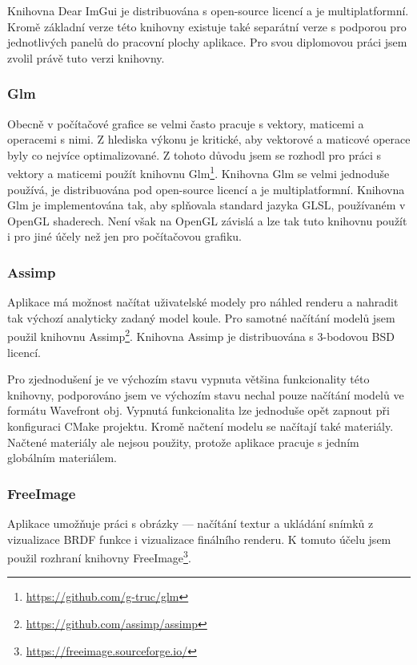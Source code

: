 \documentclass[czech,master]{diploma}
\begin{document}
Knihovna Dear ImGui je distribuována s open-source licencí a je multiplatformní. Kromě základní verze této knihovny existuje také separátní verze s podporou pro  jednotlivých panelů do pracovní plochy aplikace. Pro svou diplomovou práci jsem zvolil právě tuto verzi knihovny.

\subsubsection{Glm}
Obecně v počítačové grafice se velmi často pracuje s vektory, maticemi a operacemi s nimi. Z hlediska výkonu je kritické, aby vektorové a maticové operace byly co nejvíce optimalizované. Z tohoto důvodu jsem se rozhodl pro práci s vektory a maticemi použít knihovnu Glm\footnote{\url{https://github.com/g-truc/glm}}. Knihovna Glm se velmi jednoduše používá, je distribuována pod open-source licencí a je multiplatformní. Knihovna Glm je implementována tak, aby splňovala standard jazyka GLSL, používaném v OpenGL shaderech. Není však na OpenGL závislá a lze tak tuto knihovnu použít i pro jiné účely než jen pro počítačovou grafiku.

\subsubsection{Assimp}
Aplikace má možnost načítat uživatelské modely pro náhled renderu a nahradit tak výchozí analyticky zadaný model koule. Pro samotné načítání modelů jsem použil knihovnu Assimp\footnote{\url{https://github.com/assimp/assimp}}. Knihovna Assimp je distribuována s 3-bodovou BSD licencí. \par
Pro zjednodušení je ve výchozím stavu vypnuta většina funkcionality této knihovny, podporováno jsem ve výchozím stavu nechal pouze načítání modelů ve formátu Wavefront obj. Vypnutá funkcionalita lze jednoduše opět zapnout při konfiguraci CMake projektu. Kromě načtení modelu se načítají také materiály. Načtené materiály ale nejsou použity, protože aplikace pracuje s jedním globálním materiálem.

\subsubsection{FreeImage}
Aplikace umožňuje práci s obrázky --- načítání textur a ukládání snímků z vizualizace BRDF funkce i vizualizace finálního renderu. K tomuto účelu jsem použil rozhraní knihovny FreeImage\footnote{\url{https://freeimage.sourceforge.io/}}.
\end{document}
